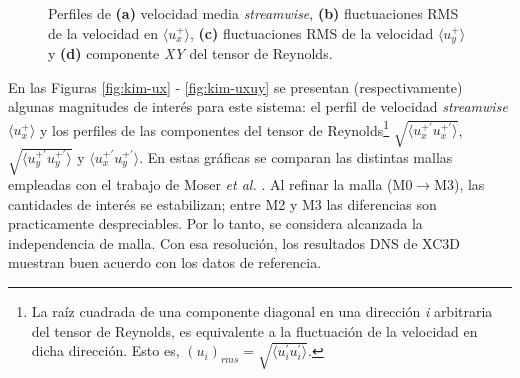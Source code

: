 \begin{figure}[H]
 \caption{Perfiles de \textbf{(a)} velocidad media \textit{streamwise}, \textbf{(b)} fluctuaciones RMS de la velocidad en $\langle u^+_x \rangle$, \textbf{(c)} fluctuaciones RMS de la velocidad $\langle u^+_y \rangle$ y \textbf{(d)} componente \textit{XY} del tensor de Reynolds. } 
 \label{fig:kim_1}
\end{figure}

En las Figuras \ref{fig:kim-ux} - \ref{fig:kim-uxuy} se presentan (respectivamente) algunas magnitudes de interés para este sistema: el perfil de velocidad \textit{streamwise} $\langle u^+_x \rangle$ y los perfiles de las componentes del tensor de Reynolds\footnote{La raíz cuadrada de una componente diagonal en una dirección \textit{i} arbitraria del tensor de Reynolds, es equivalente a la fluctuación de la velocidad en dicha dirección. Esto es, $(u_i)_{rms} = \sqrt{ \langle u^{\prime}_i u^{\prime}_i \rangle} $.} $\sqrt{\langle u^{+ \prime}_x u^{+ \prime}_x \rangle}$, $\sqrt{\langle u^{+ \prime}_y u^{+ \prime}_y \rangle}$ y $\langle u^{+ \prime}_x u^{+ \prime}_y \rangle$. En estas gráficas se comparan las distintas mallas empleadas con el trabajo de Moser \textit{et al.} \cite{moser1999}. Al refinar la malla (M0$\rightarrow$M3), las cantidades de interés se estabilizan; entre M2 y M3 las diferencias son practicamente despreciables. Por lo tanto, se considera alcanzada la independencia de malla. Con esa resolución, los resultados DNS de XC3D muestran buen acuerdo con los datos de referencia.


